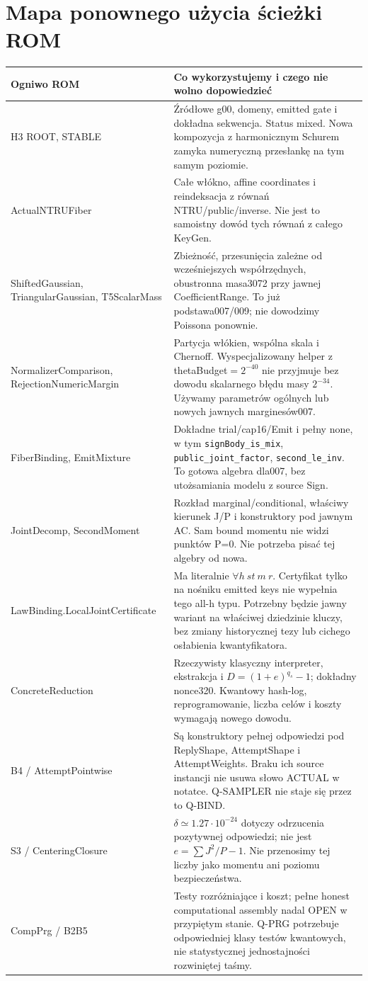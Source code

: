 \documentclass[11pt,a4paper]{article}
\newcommand{\code}[1]{\nolinkurl{#1}}
\begin{document}
\section{Mapa ponownego użycia ścieżki ROM}
\small
\begin{longtable}{@{}p{.24\linewidth}p{.69\linewidth}@{}}
\toprule Ogniwo ROM & Co wykorzystujemy i czego nie wolno dopowiedzieć \\\midrule\endhead
H3 ROOT, STABLE & Źródłowe g00, domeny, emitted gate i dokładna sekwencja.
Status mixed. Nowa kompozycja z harmonicznym Schurem zamyka numeryczną
przesłankę na tym samym poziomie.\\
ActualNTRUFiber & Całe włókno, affine coordinates i reindeksacja z równań
NTRU/public/inverse. Nie jest to samoistny dowód tych równań z całego KeyGen.\\
ShiftedGaussian, TriangularGaussian, T5ScalarMass & Zbieżność, przesunięcia
zależne od wcześniejszych współrzędnych, obustronna masa3072 przy jawnej
CoefficientRange. To już podstawa007/009; nie dowodzimy Poissona ponownie.\\
NormalizerComparison, RejectionNumericMargin & Partycja włókien, wspólna
skala i Chernoff. Wyspecjalizowany helper z thetaBudget$=2^{-40}$ nie przyjmuje
bez dowodu skalarnego błędu masy $2^{-34}$. Używamy parametrów ogólnych
lub nowych jawnych marginesów007.\\
FiberBinding, EmitMixture & Dokładne trial/cap16/Emit i pełny none, w tym
\code{signBody_is_mix}, \code{public_joint_factor}, \code{second_le_inv}.
To gotowa algebra dla007, bez utożsamiania modelu z source Sign.\\
JointDecomp, SecondMoment & Rozkład marginal/conditional, właściwy kierunek
J/P i konstruktory pod jawnym AC. Sam bound momentu nie widzi punktów
P=0. Nie potrzeba pisać tej algebry od nowa.\\
LawBinding.LocalJointCertificate & Ma literalnie $\forall h\ st\ m\ r$.
Certyfikat tylko na nośniku emitted keys nie wypełnia tego all-h typu.
Potrzebny będzie jawny wariant na właściwej dziedzinie kluczy, bez zmiany
historycznej tezy lub cichego osłabienia kwantyfikatora.\\
ConcreteReduction & Rzeczywisty klasyczny interpreter, ekstrakcja i
$D=(1+e)^{q_s}-1$; dokładny nonce320. Kwantowy hash-log, reprogramowanie,
liczba celów i koszty wymagają nowego dowodu.\\
B4 / AttemptPointwise & Są konstruktory pełnej odpowiedzi pod ReplyShape,
AttemptShape i AttemptWeights. Braku ich source instancji nie usuwa słowo
ACTUAL w notatce. Q-SAMPLER nie staje się przez to Q-BIND.\\
S3 / CenteringClosure & $\delta\simeq1.27\cdot10^{-24}$ dotyczy odrzucenia
pozytywnej odpowiedzi; nie jest $e=\sum J^2/P-1$. Nie przenosimy tej liczby
jako momentu ani poziomu bezpieczeństwa.\\
CompPrg / B2B5 & Testy rozróżniające i koszt; pełne honest computational
assembly nadal OPEN w przypiętym stanie. Q-PRG potrzebuje odpowiedniej
klasy testów kwantowych, nie statystycznej jednostajności rozwiniętej taśmy.\\
\bottomrule\end{longtable}\normalsize
\end{document}
